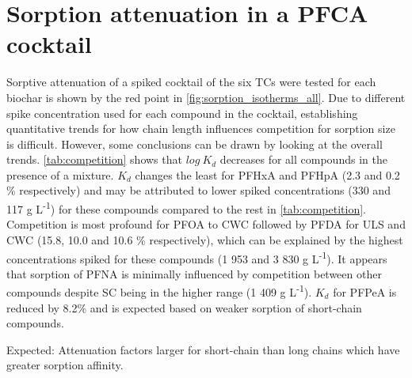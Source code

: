 
\section{Sorption attenuation in a PFCA cocktail}
Sorptive attenuation of a spiked cocktail of the six TCs were tested for each biochar is shown by the red point in \cref{fig:sorption_isotherms_all}. Due to different spike concentration used for each compound in the cocktail, establishing quantitative trends for how chain length influences competition for sorption size is difficult. However, some conclusions can be drawn by looking at the overall trends. \cref{tab:competition} shows that $log~K_d$ decreases for all compounds in the presence of a mixture. $K_d$ changes the least for PFHxA and PFHpA (2.3 and 0.2 \% respectively) and may be attributed to lower spiked concentrations (330 and 117 \textmu g L\textsuperscript{-1}) for these compounds compared to the rest in \cref{tab:competition}. Competition is most profound for PFOA to CWC followed by PFDA for ULS and CWC (15.8, 10.0 and 10.6 \% respectively), which can be explained by the highest concentrations spiked for these compounds (1 953 and 3 830 \textmu g L\textsuperscript{-1}). It appears that sorption of PFNA is minimally influenced by competition between other compounds despite SC being in the higher range (1 409 \textmu g L\textsuperscript{-1}). $K_d$ for PFPeA is reduced by 8.2\% and is expected based on weaker sorption of short-chain compounds.

Expected: Attenuation factors larger for short-chain than long chains which have greater sorption affinity.


